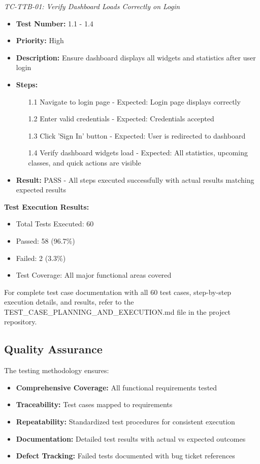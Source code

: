 \textit{TC-TTB-01: Verify Dashboard Loads Correctly on Login}
\begin{itemize}[leftmargin=*]
    \item \textbf{Test Number:} 1.1 - 1.4
    \item \textbf{Priority:} High
    \item \textbf{Description:} Ensure dashboard displays all widgets and statistics after user login
    \item \textbf{Steps:}
    \begin{enumerate}
        \item[1.1] Navigate to login page - Expected: Login page displays correctly
        \item[1.2] Enter valid credentials - Expected: Credentials accepted
        \item[1.3] Click 'Sign In' button - Expected: User is redirected to dashboard
        \item[1.4] Verify dashboard widgets load - Expected: All statistics, upcoming classes, and quick actions are visible
    \end{enumerate}
    \item \textbf{Result:} PASS - All steps executed successfully with actual results matching expected results
\end{itemize}

\textbf{Test Execution Results:}
\begin{itemize}[leftmargin=*]
    \item Total Tests Executed: 60
    \item Passed: 58 (96.7\%)
    \item Failed: 2 (3.3\%)
    \item Test Coverage: All major functional areas covered
\end{itemize}

For complete test case documentation with all 60 test cases, step-by-step execution details, and results, refer to the TEST\_CASE\_PLANNING\_AND\_EXECUTION.md file in the project repository.

\subsection{Quality Assurance}

The testing methodology ensures:
\begin{itemize}[leftmargin=*]
    \item \textbf{Comprehensive Coverage:} All functional requirements tested
    \item \textbf{Traceability:} Test cases mapped to requirements
    \item \textbf{Repeatability:} Standardized test procedures for consistent execution
    \item \textbf{Documentation:} Detailed test results with actual vs expected outcomes
    \item \textbf{Defect Tracking:} Failed tests documented with bug ticket references
\end{itemize}
